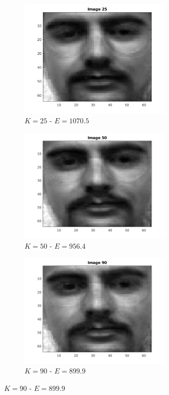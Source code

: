 \documentclass[a4paper]{article}
\begin{document}
\begin{figure}[H]
    \begin{subfigure}[c]{0.3\textwidth}
        \centering
        \includegraphics[width=0.8\textwidth]{images/ex3_17_25.png}
        \caption{$K=25$ - $E = 1070.5$}
        \label{subfig:ex3_17_25}
    \end{subfigure}
    \begin{subfigure}[c]{0.3\textwidth}
        \centering
        \includegraphics[width=0.8\textwidth]{images/ex3_17_50.png}
        \caption{$K=50$ - $E = 956.4$}
        \label{subfig:ex3_17_50}
    \end{subfigure}
    \begin{subfigure}[c]{0.3\textwidth}
        \centering
        \includegraphics[width=0.8\textwidth]{images/ex3_17_90.png}
        \caption{$K=90$ - $E = 899.9$}
        \label{subfig:ex3_17_90}
    \end{subfigure}


\end{figure}
\end{document}
